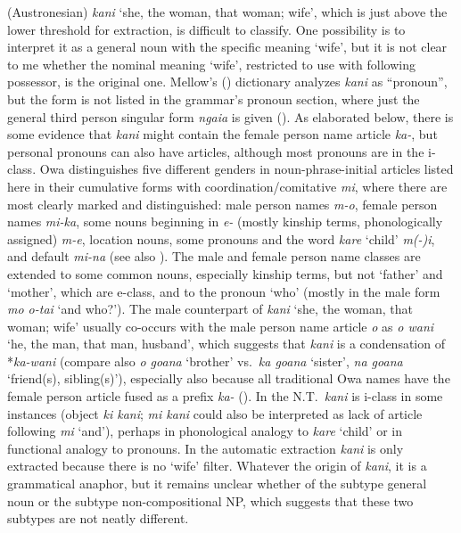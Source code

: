 \documentclass[output=collectionpaper]{langsci/langscibook}
\begin{document}
 (Austronesian) \textit{kani} ‘she, the woman, that woman; wife’, which is just above the lower threshold for extraction, is difficult to classify. One possibility is to interpret it as a general noun with the specific meaning ‘wife’, but it is not clear to me whether the nominal meaning ‘wife’, restricted to use with following possessor, is the original one. Mellow’s (\citealt*[273]{Mellow2013}) dictionary analyzes \textit{kani} as “pronoun”, but the form is not listed in the grammar’s pronoun section, where just the general third person singular form \textit{ngaia} is given (\citealt[7]{Mellow2013}). As elaborated below, there is some evidence that \textit{kani} might contain the female person name article \textit{ka-}, but personal pronouns can also have articles, although most pronouns are in the i-class. Owa distinguishes five different genders in noun-phrase-initial articles listed here in their cumulative forms with coordination/comitative \textit{mi}, where there are most clearly marked and distinguished: male person names \textit{m-o}, female person names \textit{mi-ka}, some nouns beginning in \textit{e-} (mostly kinship terms, phonologically assigned) \textit{m-e},
location nouns, some pronouns and the word \textit{kare} ‘child’ \textit{m(-)i}, and default \textit{mi-na} (see also \citealt[26]{Mellow2013}). The male and female person name classes are extended to some common nouns, especially kinship terms, but not ‘father’ and ‘mother’, which are e-class, and to the pronoun ‘who’ (mostly in the male form \textit{mo o-tai} ‘and who?’). The male counterpart of \textit{kani} ‘she, the woman, that woman; wife’ usually co-occurs with the male person name article \textit{o} as \textit{o wani} ‘he, the man, that man, husband’, which suggests that \textit{kani} is a condensation of *\textit{ka-wani} (compare also \textit{o goana} ‘brother’ vs.\ \textit{ka goana} ‘sister’, \textit{na goana} ‘friend(s), sibling(s)’), especially also because all traditional Owa names have the female person article fused as a prefix \textit{ka-} (\citealt[20]{Mellow2013}). In the N.T.\ \textit{kani} is i-class in some instances (object \textit{ki kani}; \textit{mi kani} could also be interpreted as lack of article following \textit{mi} ‘and’), perhaps in phonological analogy to \textit{kare} ‘child’ or in functional analogy to pronouns. In the automatic extraction \textit{kani} is only extracted because there is no ‘wife’ filter. Whatever the origin of \textit{kani}, it is a grammatical anaphor, but it remains unclear whether of the subtype general noun or the subtype non-compositional NP, which suggests that these two subtypes are not neatly different.
\end{document}
